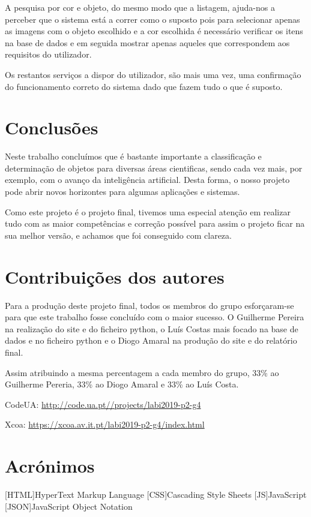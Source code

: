 \documentclass{report}
\begin{document}
A pesquisa por cor e objeto, do mesmo modo que a listagem, ajuda-nos a perceber que o sistema está a correr como o suposto pois para selecionar apenas as imagens com o objeto escolhido e a cor escolhida é necessário verificar os itens na base de dados e em seguida mostrar apenas aqueles que correspondem aos requisitos do utilizador.

Os restantos serviços a dispor do utilizador, são mais uma vez, uma confirmação do funcionamento correto do sistema dado que fazem tudo o que é suposto.

\chapter{Conclusões}
\label{chap.Conclusao}

Neste trabalho concluímos que é bastante importante a classificação e determinação de objetos para diversas áreas cientificas, sendo cada vez mais, por exemplo, com o avanço da inteligência artificial. Desta forma, o nosso projeto pode abrir novos horizontes para algumas aplicações e sistemas.

Como este projeto é o projeto final, tivemos uma especial atenção em realizar tudo com as maior competências e correção possível para assim o projeto ficar na sua melhor versão, e achamos que foi conseguido com clareza.

\chapter*{Contribuições dos autores}

Para a produção deste projeto final, todos os membros do grupo esforçaram-se para que este trabalho fosse concluído com o maior sucesso. O Guilherme Pereira na realização do site e do ficheiro python, o Luís Costas mais focado na base de dados e no ficheiro python e o Diogo Amaral na produção do site e do relatório final. 

Assim atribuindo a mesma percentagem a cada membro do grupo, 33\% ao Guilherme Pereria, 33\% ao Diogo Amaral e 33\% ao Luís Costa.

CodeUA: \url{http://code.ua.pt//projects/labi2019-p2-g4}

Xcoa: \url{https://xcoa.av.it.pt/labi2019-p2-g4/index.html}
\chapter*{Acrónimos}
\begin{acronym}
[HTML]{HyperText Markup Language}
[CSS]{Cascading Style Sheets}
[JS]{JavaScript}
[JSON]{JavaScript Object Notation}
\end{acronym}


\printbibliography
\end{document}
